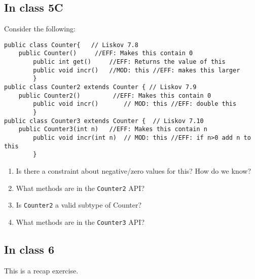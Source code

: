 \documentclass[11pt]{article}
\begin{document}
\subsection{In class 5C}
\label{sec:orgeeef43a}
Consider the following:
\begin{verbatim}
public class Counter{   // Liskov 7.8
    public Counter()     //EFF: Makes this contain 0
        public int get()     //EFF: Returns the value of this
        public void incr()   //MOD: this //EFF: makes this larger
        }
public class Counter2 extends Counter { // Liskov 7.9
    public Counter2()         //EFF: Makes this contain 0
        public void incr()       // MOD: this //EFF: double this
        }
public class Counter3 extends Counter {  // Liskov 7.10
    public Counter3(int n)   //EFF: Makes this contain n
        public void incr(int n)  // MOD: this //EFF: if n>0 add n to this
        }
\end{verbatim}

\begin{enumerate}
\item Is there a constraint about negative/zero values for this? How do we know?
\item What methods are in the \texttt{Counter2} API?
\item Is \texttt{Counter2} a valid subtype of Counter?
\item What methods are in the \texttt{Counter3} API?
\end{enumerate}

\subsection{In class 6}
\label{sec:org8451126}
This is a recap exercise.
\end{document}
